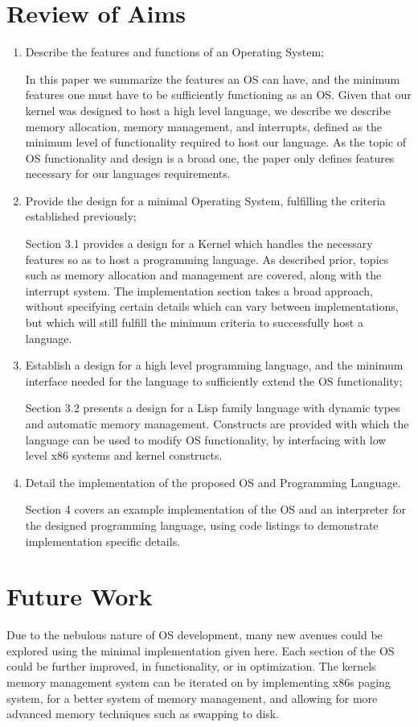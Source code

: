 \documentclass[10pt]{report}
\begin{document}
\section{Review of Aims}
\begin{enumerate}
\item Describe the features and functions of an Operating System;
  
  In this paper we summarize the features an OS can have, and the minimum features one must have to be sufficiently functioning as an OS. Given that our kernel was designed to host a high level language, we describe we describe memory allocation, memory management, and interrupts, defined as the minimum level of functionality required to host our language. As the topic of OS functionality and design is a broad one, the paper only defines features necessary for our languages requirements.
  
\item Provide the design for a minimal Operating System, fulfilling the criteria established previously;
  
  Section 3.1 provides a design for a Kernel which handles the necessary features so as to host a programming language. As described prior, topics such as memory allocation and management are covered, along with the interrupt system. The implementation section takes a broad approach, without specifying certain details which can vary between implementations, but which will still fulfill the minimum criteria to successfully host a language.
  
\item Establish a design for a high level programming language, and the minimum interface needed for the language to sufficiently extend the OS functionality;

  Section 3.2 presents a design for a Lisp family language with dynamic types and automatic memory management. Constructs are provided with which the language can be used to modify OS functionality, by interfacing with low level x86 systems and kernel constructs.
  
\item Detail the implementation of the proposed OS and Programming Language.

  Section 4 covers an example implementation of the OS and an interpreter for the designed programming language, using code listings to demonstrate implementation specific details.
\end{enumerate}

\section{Future Work}
Due to the nebulous nature of OS development, many new avenues could be explored using the minimal implementation given here. Each section of the OS could be further improved, in functionality, or in optimization. The kernels memory management system can be iterated on by implementing x86s paging system, for a better system of memory management, and allowing for more advanced memory techniques such as swapping to disk.
\end{document}
